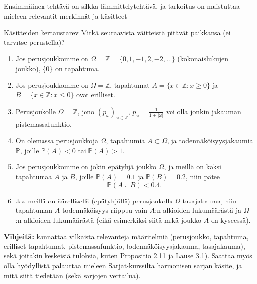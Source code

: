 \documentclass[11pt,a4paper]{amsart}
\newcommand{\Z}{\mathbb{Z}}
\newcommand{\1}{\mathbf{1}}
\renewcommand{\P}{\mathbb P}
\begin{document}
Ensimmäinen tehtävä on silkka lämmittelytehtävä, ja tarkoitus on muistuttaa mieleen relevantit merkinnät ja käsitteet.
\begin{Exercises}{Käsitteiden kertausta}{rev}
Mitkä seuraavista väitteistä pitävät paikkansa (ei tarvitse perustella)? 
\begin{enumerate}
\item Jos perusjoukkomme on $\Omega=\Z=\{0,1,-1,2,-2,...\}$ (kokonaislukujen joukko),  $\{0\}$ on tapahtuma. 

    
\item Jos perusjoukkomme on $\Omega=\Z$, tapahtumat $A=\{x\in \Z: x\geq 0\}$ ja $B=\{x\in \Z: x\leq 0\}$ ovat erilliset.

    
\item Perusjoukolle $\Omega=\Z$, jono $(p_\omega)_{\omega\in \Z}$, $p_\omega=\frac{1}{1+|\omega|}$ voi olla jonkin jakauman pistemassafunktio.
    
\item On olemassa perusjoukkoja $\Omega$‚ tapahtumia $A\subset \Omega$‚ ja todennäköisyysjakaumia $\P$, joille $\P(A)<0$ tai $\P(A)>1$.

    
\item Jos perusjoukkomme on jokin epätyhjä joukko $\Omega$, ja meillä on kaksi tapahtumaa $A$ ja $B$, joille $\P(A)=0.1$ ja $\P(B)=0.2$, niin pätee
\[
\P(A\cup B)<0.4.
\]

    
\item Jos meillä on äärellisellä (epätyhjällä) perusjoukolla $\Omega$ tasajakauma, niin tapahtuman $A$ todennäköisyys riippuu vain $A$:n alkioiden lukumäärästä ja $\Omega$:n alkioiden lukumäärästä (eikä esimerkiksi siitä mikä joukko $A$ on kyseessä).

    
\end{enumerate}
{\bf Vihjeitä:} kannattaa vilkaista relevanteja määritelmiä (perusjoukko, tapahtuma, erilliset tapahtumat, pistemassafunktio, todennäköisyysjakauma, tasajakauma), sekä joitakin keskeisiä tuloksia, kuten Propositio 2.11 ja Lause 3.1). Saattaa myös olla hyödyllistä palauttaa mieleen Sarjat-kurssilta harmonisen sarjan käsite, ja mitä siitä tiedetään (sekä sarjojen vertailua).
\end{Exercises}
\end{document}
